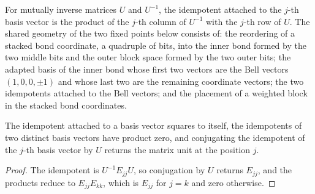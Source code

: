 \begin{definition}
    \label{def:asymex_basis_proj}
    \leanok
    For mutually inverse matrices $U$ and $U^{-1}$, the idempotent attached
    to the $j$-th basis vector is the product of the $j$-th column of
    $U^{-1}$ with the $j$-th row of $U$. The shared geometry of the two
    fixed points below consists of: the reordering of a stacked bond
    coordinate, a quadruple of bits, into the inner bond formed by the two
    middle bits and the outer block space formed by the two outer bits; the
    adapted basis of the inner bond whose first two vectors are the Bell
    vectors $(1,0,0,\pm1)$ and whose last two are the remaining coordinate
    vectors; the two idempotents attached to the Bell vectors; and the
    placement of a weighted block in the stacked bond coordinates.
\end{definition}

\begin{lemma}
    \label{lem:asymex_basis_proj}
    \leanok
    The idempotent attached to a basis vector squares to itself, the
    idempotents of two distinct basis vectors have product zero, and
    conjugating the idempotent of the $j$-th basis vector by $U$ returns the
    matrix unit at the position $j$.
\end{lemma}

\begin{proof}
    \leanok
    The idempotent is $U^{-1}E_{jj}U$, so conjugation by $U$ returns
    $E_{jj}$, and the products reduce to $E_{jj}E_{kk}$, which is $E_{jj}$
    for $j=k$ and zero otherwise.
\end{proof}

